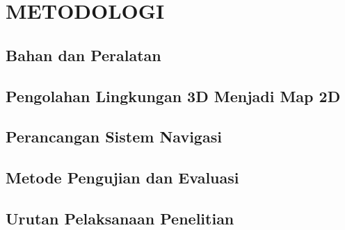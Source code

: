 \chapter{METODOLOGI}
\label{chap:desainimplementasi}

\section{Bahan dan Peralatan}
\label{sec:bahandanperalatan}


\section{Pengolahan Lingkungan 3D Menjadi Map 2D}
\label{sec:pengolahandatamap}


\section{Perancangan Sistem Navigasi}
\label{sec:sistemnavigasi}


\section{Metode Pengujian dan Evaluasi}
\label{sec:metodepengujian}


\section{Urutan Pelaksanaan Penelitian}
\label{sec:urutanpelaksanaan}

